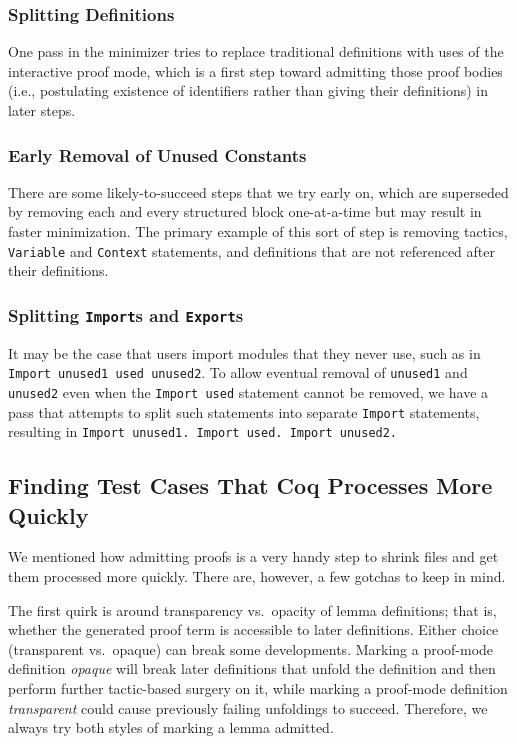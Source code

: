 \documentclass[a4paper,USenglish,cleveref,autoref,thm-restate,pdfa]{lipics-v2021}
\begin{document}
\subsubsection{Splitting Definitions}
One pass in the minimizer tries to replace traditional definitions with uses of the interactive proof mode, which is a first step toward admitting those proof bodies (i.e., postulating existence of identifiers rather than giving their definitions) in later steps.

\subsubsection{Early Removal of Unused Constants}
There are some likely-to-succeed steps that we try early on, which are superseded by removing each and every structured block one-at-a-time but may result in faster minimization.
The primary example of this sort of step is removing tactics, \verb|Variable| and \verb|Context| statements, and definitions that are not referenced after their definitions.

\subsubsection{Splitting \texttt{Import}s and \texttt{Export}s}\label{sec:split-imports}
It may be the case that users import modules that they never use, such as in \texttt{Import unused1 used unused2}.
To allow eventual removal of \verb|unused1| and \verb|unused2| even when the \verb|Import used| statement cannot be removed, we have a pass that attempts to split such statements into separate \verb|Import| statements, resulting in \texttt{Import unused1. Import used. Import unused2.}

\subsection{Finding Test Cases That Coq Processes More Quickly}

We mentioned how admitting proofs is a very handy step to shrink files and get them processed more quickly.
There are, however, a few gotchas to keep in mind.

The first quirk is around transparency vs.\ opacity of lemma definitions; that is, whether the generated proof term is accessible to later definitions.
Either choice (transparent vs.\ opaque) can break some developments.
Marking a proof-mode definition \emph{opaque} will break later definitions that unfold the definition and then perform further tactic-based surgery on it, while marking a proof-mode definition \emph{transparent} could cause previously failing unfoldings to succeed.
Therefore, we always try both styles of marking a lemma admitted.
\end{document}
